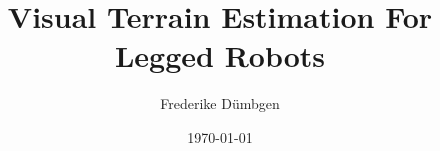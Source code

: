 \documentclass{beamer}
\title{Visual Terrain Estimation For Legged Robots}
\author{Frederike Dümbgen}
\date{\today}
\begin{document}
\frame{\titlepage}





\end{document}
